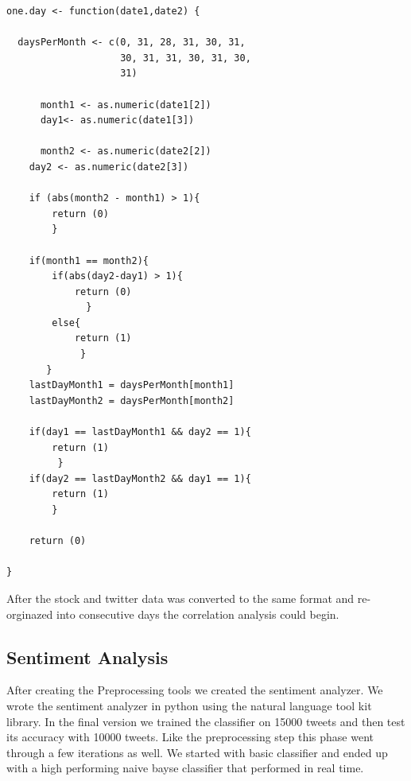 \documentclass{acm_proc_article-sp}
\begin{document}
\break 
\begin{verbatim}
one.day <- function(date1,date2) {

  daysPerMonth <- c(0, 31, 28, 31, 30, 31, 
                    30, 31, 31, 30, 31, 30, 
                    31)
       
      month1 <- as.numeric(date1[2])
      day1<- as.numeric(date1[3])

      month2 <- as.numeric(date2[2])
    day2 <- as.numeric(date2[3])

    if (abs(month2 - month1) > 1){
        return (0)
        }

    if(month1 == month2){
        if(abs(day2-day1) > 1){
            return (0)
              }
        else{
            return (1)
             }
       }
    lastDayMonth1 = daysPerMonth[month1]
    lastDayMonth2 = daysPerMonth[month2]

    if(day1 == lastDayMonth1 && day2 == 1){
        return (1)
         }
    if(day2 == lastDayMonth2 && day1 == 1){
        return (1)
        }

    return (0)

}

\end{verbatim}

After the stock and twitter data was converted to the same format and
re-orginazed into consecutive days the correlation analysis could begin. 

\subsection{Sentiment Analysis}

After creating the Preprocessing tools we created the sentiment analyzer.  We
wrote the sentiment analyzer in python using the natural language tool kit
library. In the final version we trained the classifier on 15000 tweets and
then test its accuracy with 10000 tweets. Like the preprocessing step this
phase went through a few iterations as well. We started with basic classifier
and ended up with a high performing naive bayse classifier that performed in
real time.
\end{document}
